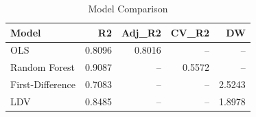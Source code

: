 \begin{table}[htbp]
\centering
\caption{Model Comparison}
\label{tab:model_comparison}
\begin{tabular}{lrrrr}
\toprule
Model & R2 & Adj\_R2 & CV\_R2 & DW \\
\midrule
  OLS & 0.8096 & 0.8016 & -- & -- \\
  Random Forest & 0.9087 & -- & 0.5572 & -- \\
  First-Difference & 0.7083 & -- & -- & 2.5243 \\
  LDV & 0.8485 & -- & -- & 1.8978 \\
\bottomrule
\end{tabular}
\end{table}